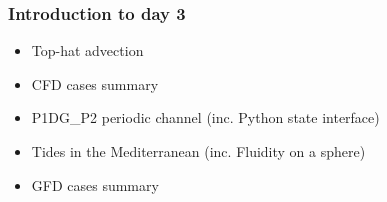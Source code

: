 \documentclass[12pt]{beamer}
\begin{document}
\begin{frame}
    \frametitle{Introduction to day 3}
\begin{itemize}
\item Top-hat advection
\item CFD cases summary
\item P1DG\_P2 periodic channel (inc. Python state interface)
\item Tides in the Mediterranean (inc. Fluidity on a sphere)
\item GFD cases summary
\end{itemize}
\end{frame}
\end{document}
